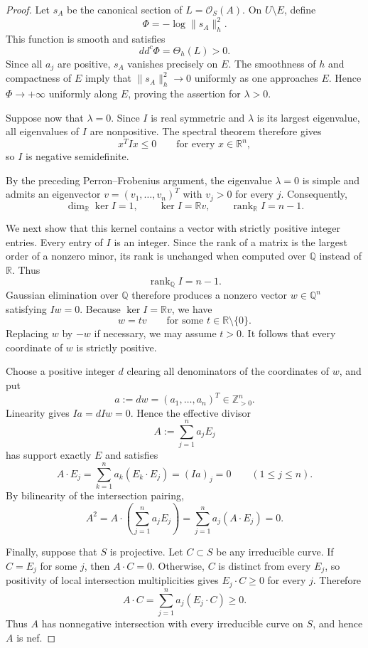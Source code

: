 \documentclass[11pt]{amsart}
\theoremstyle{definition}
\theoremstyle{remark}
\numberwithin{equation}{section}
\newcommand{\OO}{\mathcal O}
\newcommand{\ddc}{dd^c}
\begin{document}
\begin{proof}
Let $s_A$ be the canonical section of $L=\OO_S(A)$.
On $U\setminus E$, define
\[
 \Phi=-\log\|s_A\|_h^2.
\]
This function is smooth and satisfies
\[
 \ddc\Phi=\Theta_h(L)>0.
\]
Since all $a_j$ are positive, $s_A$ vanishes precisely on $E$.
The smoothness of $h$ and compactness of $E$ imply that
$\|s_A\|_h^2\to0$ uniformly as one approaches $E$.
Hence $\Phi\to+\infty$ uniformly along $E$, proving the
assertion for $\lambda>0$.

Suppose now that $\lambda=0$. Since $I$ is real symmetric
and $\lambda$ is its largest eigenvalue, all eigenvalues
of $I$ are nonpositive. The spectral theorem therefore gives
\[
  x^T I x\le0
  \qquad\text{for every }x\in\mathbb{R}^n,
\]
so $I$ is negative semidefinite.

By the preceding Perron--Frobenius argument, the eigenvalue
$\lambda=0$ is simple and admits an eigenvector
$v=(v_1,\ldots,v_n)^T$ with $v_j>0$ for every $j$.
Consequently,
\[
  \dim_{\mathbb{R}}\ker I=1,
  \qquad
  \ker I=\mathbb{R}v,
  \qquad
  \operatorname{rank}_{\mathbb{R}}I=n-1.
\]

We next show that this kernel contains a vector with
strictly positive integer entries. Every entry of $I$
is an integer. Since the rank of a matrix is the largest
order of a nonzero minor, its rank is unchanged when
computed over $\mathbb{Q}$ instead of $\mathbb{R}$.
Thus
\[
  \operatorname{rank}_{\mathbb{Q}}I=n-1.
\]
Gaussian elimination over $\mathbb{Q}$ therefore produces
a nonzero vector $w\in\mathbb{Q}^n$ satisfying $Iw=0$.
Because $\ker I=\mathbb{R}v$, we have
\[
  w=t v
  \qquad\text{for some }t\in\mathbb{R}\setminus\{0\}.
\]
Replacing $w$ by $-w$ if necessary, we may assume $t>0$.
It follows that every coordinate of $w$ is strictly positive.

Choose a positive integer $d$ clearing all denominators
of the coordinates of $w$, and put
\[
  a:=dw=(a_1,\ldots,a_n)^T\in\mathbb{Z}_{>0}^n.
\]
Linearity gives $Ia=dIw=0$. Hence the effective divisor
\[
  A:=\sum_{j=1}^n a_jE_j
\]
has support exactly $E$ and satisfies
\[
  A\cdot E_j
    =\sum_{k=1}^n a_k(E_k\cdot E_j)
    =(Ia)_j=0
  \qquad(1\le j\le n).
\]
By bilinearity of the intersection pairing,
\[
  A^2
    =A\cdot\left(\sum_{j=1}^n a_jE_j\right)
    =\sum_{j=1}^n a_j(A\cdot E_j)
    =0.
\]

Finally, suppose that $S$ is projective. Let $C\subset S$
be any irreducible curve. If $C=E_j$ for some $j$, then
$A\cdot C=0$. Otherwise, $C$ is distinct from every $E_j$,
so positivity of local intersection multiplicities gives
$E_j\cdot C\ge0$ for every $j$. Therefore
\[
  A\cdot C=\sum_{j=1}^n a_j(E_j\cdot C)\ge0.
\]
Thus $A$ has nonnegative intersection with every
irreducible curve on $S$, and hence $A$ is nef.
\end{proof}
\end{document}
